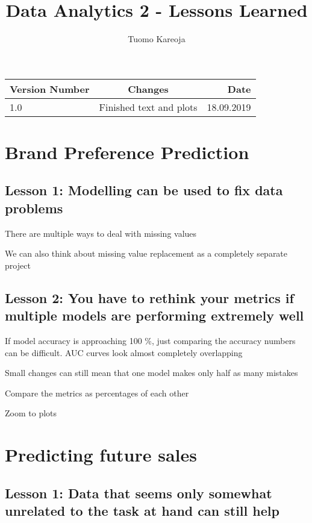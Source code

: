 \documentclass[12pt,a4paper,leqno]{report}
\title{Data Analytics 2 - Lessons Learned}
\author{Tuomo Kareoja}
\date{}
\theoremstyle{plain}
\theoremstyle{definition}
\theoremstyle{remark}
\begin{document}
\maketitle

\begin{table}[h!]
  \begin{center}
    \begin{tabular}{l|c|r}
      \textbf{Version Number} & \textbf{Changes} & \textbf{Date} \\
      \hline
      1.0 & Finished text and plots & 18.09.2019\\
    \end{tabular}
  \end{center}
\end{table}

\newpage

\section{Brand Preference Prediction}

\subsection{Lesson 1: Modelling can be used to fix data problems}

There are multiple ways to deal with missing values

We can also think about missing value replacement as a completely separate project

\subsection{Lesson 2: You have to rethink your metrics if multiple models are performing extremely well}

If model accuracy is approaching 100 \%, just comparing the accuracy numbers can be difficult.
AUC curves look almost completely overlapping

Small changes can still mean that one model makes only half as many mistakes

Compare the metrics as percentages of each other

Zoom to plots

\section{Predicting future sales}

\subsection{Lesson 1: Data that seems only somewhat unrelated to the task at hand can still help}
\end{document}
